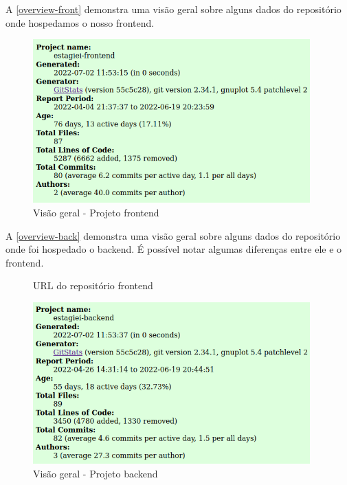 A \autoref{overview-front} demonstra uma visão geral sobre alguns dados do repositório onde hospedamos o nosso \gls{frontend}.

\begin{figure}[H]
	\centering
	\caption{\label{overview-front}Visão geral - Projeto \gls{frontend}}
	\includegraphics[width=0.95\textwidth]{../imagens/stats/overview-frontend.png}
\end{figure}

A \autoref{overview-back} demonstra uma visão geral sobre alguns dados do repositório onde foi hospedado o backend. É possível notar algumas diferenças entre ele e o \gls{frontend}.

\begin{figure}[htb]
	\caption{\label{qr-url-front}URL do repositório \gls{frontend}}
	\begin{center}
	\end{center}
\end{figure}

\begin{figure}[H]
	\centering
	\caption{\label{overview-back}Visão geral - Projeto \gls{backend}}
	\includegraphics[width=0.95\textwidth]{../imagens/stats/overview-backend.png}
\end{figure}

